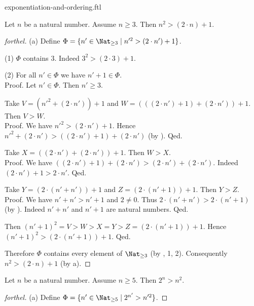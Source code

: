 \documentclass{naproche-library}
\begin{document}
\begin{smodule}{exponentiation-and-ordering.ftl}
  \begin{proposition}[forthel,id=ARITHMETIC_09_134060414337024]
    Let $n$ be a natural number.
    Assume $n \geq 3$.
    Then $n^{2} > (2 \cdot n) + 1$.
  \end{proposition}
  \begin{proof}[forthel]
    (a) Define $\Phi = \{ n' \in \Nat_{\geq 3} \mid n'^{2} > (2 \cdot n') + 1 \}$.

    (1) $\Phi$ contains $3$.
    Indeed $3^{2} > (2 \cdot 3) + 1$.

    (2) For all $n' \in \Phi$ we have $n' + 1 \in \Phi$. \\
    Proof.
      Let $n' \in \Phi$.
      Then $n' \geq 3$.

      Take $V = (n'^{2} + (2 \cdot n')) + 1$ and $W = (((2 \cdot n') + 1) + (2 \cdot n')) + 1$.
      Then $V > W$. \\
      Proof.
        We have $n'^{2} > (2 \cdot n') + 1$.
        Hence $n'^{2} + (2 \cdot n') > ((2 \cdot n') + 1) + (2 \cdot n')$ (by ).
      Qed.

      Take $X = ((2 \cdot n') + (2 \cdot n')) + 1$.
      Then $W > X$. \\
      Proof.
        We have $((2 \cdot n') + 1) + (2 \cdot n') > (2 \cdot n') + (2 \cdot n')$.
        Indeed $(2 \cdot n') + 1 > 2 \cdot n'$.
      Qed.

      Take $Y = (2 \cdot (n' + n')) + 1$ and $Z = (2 \cdot (n' + 1)) + 1$.
      Then $Y > Z$. \\
      Proof.
        We have $n' + n' > n' + 1$ and $2 \neq 0$.
        Thus $2 \cdot (n' + n') > 2 \cdot (n' + 1)$ (by ).
        Indeed $n' + n'$ and $n' + 1$ are natural numbers.
      Qed.

      Then $(n' + 1)^{2} = V > W > X = Y > Z = (2 \cdot (n' + 1)) + 1$.
      Hence $(n' + 1)^{2} > (2 \cdot (n' + 1)) + 1$.
    Qed.

    Therefore $\Phi$ contains every element of $\Nat_{\geq 3}$ (by , 1, 2).
    Consequently $n^{2} > (2 \cdot n) + 1$ (by a).
  \end{proof}

  \begin{proposition}[forthel,id=ARITHMETIC_09_1097950367318016]
    Let $n$ be a natural number.
    Assume $n \geq 5$.
    Then $2^{n} > n^{2}$.
  \end{proposition}
  \begin{proof}[forthel]
    (a) Define $\Phi = \{ n' \in \Nat_{\geq 5} \mid 2^{n'} > n'^{2} \}$.


\end{proof}
\end{smodule}
\end{document}
